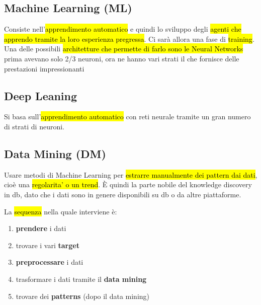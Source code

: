 \subsection{Machine Learning (ML)}

Consiste nell'\hl{apprendimento automatico} e quindi lo sviluppo degli \hl{agenti che apprendo tramite la loro esperienza pregressa}. Ci sarà allora una fase di \hl{training}.
Una delle possibili \hl{architetture che permette di farlo sono le Neural Networks} prima avevano solo 2/3 neuroni, ora ne hanno vari strati il che fornisce delle prestazioni impressionanti


\subsection{Deep Leaning}

Si basa sull'\hl{apprendimento automatico} con reti neurale tramite un gran numero di strati di neuroni.


\subsection{Data Mining (DM)}

Usare metodi di Machine Learning per \hl{estrarre manualmente dei pattern dai dati}, cioè una \hl{regolarita' o un trend}. È quindi la parte nobile del knowledge discovery in db, dato che i dati sono in genere disponibili su db o da altre piattaforme.

La \hl{sequenza} nella quale interviene è:
\begin{enumerate}
	\item \textbf{prendere} i dati
	\item trovare i vari \textbf{target}
	\item \textbf{preprocessare} i dati
	\item trasformare i dati tramite il \textbf{data mining}
	\item trovare dei \textbf{patterns} (dopo il data mining)
\end{enumerate}

































